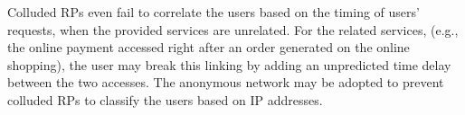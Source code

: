 \begin{itemize}

\end{itemize}

Colluded RPs even fail to correlate the users based on the timing of users' requests, when the provided services are unrelated. For the related services, (e.g., the online payment accessed right after an order generated on the online shopping), the user may break this linking by adding an unpredicted time delay between the two accesses. The anonymous network may be adopted to prevent colluded RPs to classify the users based on IP addresses.

\begin{comment}
\begin{itemize}
  \item A \textbf{curious} RP fails to infer the user's unique identifier (i.e., UID) through $PUID$.
   \item A \textbf{colluded curious} RP fails to link a user between RPs.
  \item A \textbf{malicious} RP fails to make the UID leaked.
  \item The \textbf{colluded malicious RPs} fail to (actively) make the UID leaked.
  \item The \textbf{colluded malicious RPs} fail to actively trigger the generation of a same PPID or derivable PPIDs.
  \item The \textbf{colluded malicious RPs} fail to passively link a user between RPs.
\end{itemize}
\end{comment}

